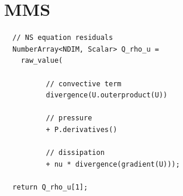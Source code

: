 \documentclass{article}
\begin{document}
\section{MMS}
\begin{verbatim}
  // NS equation residuals
  NumberArray<NDIM, Scalar> Q_rho_u = 
    raw_value(

	      // convective term
	      divergence(U.outerproduct(U))

	      // pressure
	      + P.derivatives()

	      // dissipation
	      + nu * divergence(gradient(U)));

  return Q_rho_u[1];
\end{verbatim}
\end{document}
